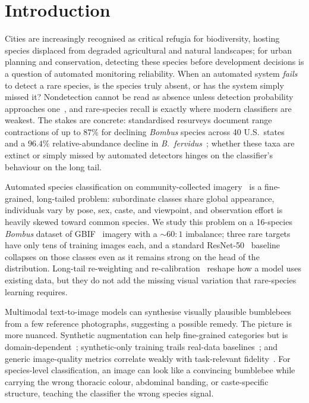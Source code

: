 \documentclass[runningheads]{llncs}
\begin{document}
\section{Introduction}
\label{sec:intro}

Cities are increasingly recognised as critical refugia for
biodiversity, hosting species displaced from degraded agricultural and
natural landscapes; for urban planning and conservation, detecting
these species before development decisions is a question of automated
monitoring reliability. When an automated system \emph{fails} to
detect a rare species, is the species truly absent, or has the system
simply missed it? Nondetection cannot be read as absence unless
detection probability approaches one~\cite{mackenzie_estimating_2002},
and rare-species recall is exactly where modern classifiers are
weakest. The stakes are concrete: standardised resurveys document
range contractions of up to $87\%$ for declining \emph{Bombus} species
across 40 U.S.\ states~\cite{cameron_patterns_2011} and a $96.4\%$
relative-abundance decline in
\emph{B.~fervidus}~\cite{jacobson_decline_2018}; whether these taxa are
extinct or simply missed by automated detectors hinges on the
classifier's behaviour on the long tail.

Automated species classification on community-collected
imagery~\cite{horn_inaturalist_2018, liu_large-scale_2019} is a
fine-grained, long-tailed problem: subordinate classes share global
appearance, individuals vary by pose, sex, caste, and viewpoint, and
observation effort is heavily skewed toward common species. We study
this problem on a 16-species \emph{Bombus} dataset of
GBIF~\cite{gbif_home_2025} imagery with a $\sim$$60{:}1$ imbalance;
three rare targets have only tens of training images each, and a
standard ResNet-50~\cite{he_deep_2015} baseline collapses on those
classes even as it remains strong on the head of the distribution.
Long-tail re-weighting and re-calibration~\cite{cao_learning_2019,
cui_class-balanced_2019, kang_decoupling_2020} reshape how a model uses
existing data, but they do not add the missing visual variation that
rare-species learning requires.

Multimodal text-to-image models can synthesise visually plausible
bumblebees from a few reference photographs, suggesting a possible 
remedy. The picture is more nuanced. Synthetic augmentation can help
fine-grained categories but is domain-dependent~\cite{he_is_2023,
michaeli_advancing_2025, zhao_ltgc_2024}; synthetic-only training
trails real-data baselines~\cite{azizi_synthetic_2023}; and generic
image-quality metrics correlate weakly with task-relevant
fidelity~\cite{borji_pros_2021, jayasumana_rethinking_2024}. For
species-level classification, an image can look like a convincing
bumblebee while carrying the wrong thoracic colour, abdominal banding,
or caste-specific structure, teaching the classifier the wrong species
signal.
\end{document}
